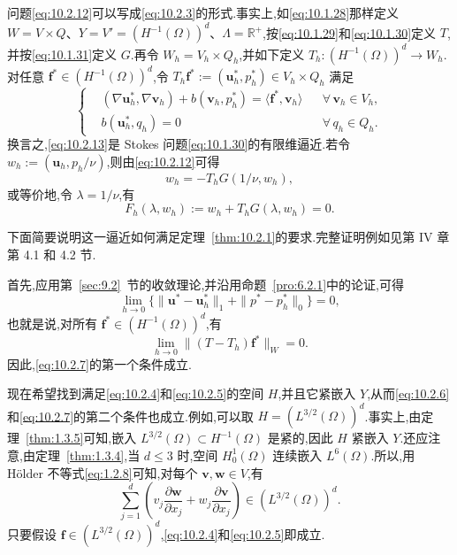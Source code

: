问题\eqref{eq:10.2.12}可以写成\eqref{eq:10.2.3}的形式.事实上,如\eqref{eq:10.1.28}那样定义 \(W=V\times Q\)、\(Y=V'=(H^{-1}(\Omega))^d\)、\(\Lambda=\mathbb R^+\),按\eqref{eq:10.1.29}和\eqref{eq:10.1.30}定义 \(T\),并按\eqref{eq:10.1.31}定义 \(G\).再令 \(W_h=V_h\times Q_h\),并如下定义 \(T_h\colon(H^{-1}(\Omega))^d\to W_h\).对任意 \(\boldsymbol{f}^*\in(H^{-1}(\Omega))^d\),令 \(T_h\boldsymbol{f}^*:=(\boldsymbol{u}_h^*,p_h^*)\in V_h\times Q_h\) 满足
\begin{equation}\label{eq:10.2.13}
  \left\{
  \begin{aligned}
    &(\nabla\boldsymbol{u}_h^*,\nabla\boldsymbol{v}_h)+b(\boldsymbol{v}_h,p_h^*)
       =\langle\boldsymbol{f}^*,\boldsymbol{v}_h\rangle&&\forall\,\boldsymbol{v}_h\in V_h,\\
    &b(\boldsymbol{u}_h^*,q_h)=0&&\forall\,q_h\in Q_h .
  \end{aligned}
  \right.
\end{equation}
换言之,\eqref{eq:10.2.13}是 Stokes 问题\eqref{eq:10.1.30}的有限维逼近.若令 \(w_h:=(\boldsymbol{u}_h,p_h/\nu)\),则由\eqref{eq:10.2.12}可得
\[
  w_h=-T_hG(1/\nu,w_h),
\]
或等价地,令 \(\lambda=1/\nu\),有
\[
  F_h(\lambda,w_h):=w_h+T_hG(\lambda,w_h)=0.
\]

下面简要说明这一逼近如何满足定理~\ref{thm:10.2.1}的要求.完整证明例如见第 IV 章第 4.1 和 4.2 节.

首先,应用第~\ref{sec:9.2}~节的收敛理论,并沿用命题~\ref{pro:6.2.1}中的论证,可得
\[
  \lim_{h\to0}\{\|\boldsymbol{u}^*-\boldsymbol{u}_h^*\|_1+\|p^*-p_h^*\|_0\}=0,
\]
也就是说,对所有 \(\boldsymbol{f}^*\in(H^{-1}(\Omega))^d\),有
\begin{equation}\label{eq:10.2.14}
  \lim_{h\to0}\|(T-T_h)\boldsymbol{f}^*\|_W=0.
\end{equation}
因此,\eqref{eq:10.2.7}的第一个条件成立.

现在希望找到满足\eqref{eq:10.2.4}和\eqref{eq:10.2.5}的空间 \(H\),并且它紧嵌入 \(Y\),从而\eqref{eq:10.2.6}和\eqref{eq:10.2.7}的第二个条件也成立.例如,可以取 \(H=(L^{3/2}(\Omega))^d\).事实上,由定理~\ref{thm:1.3.5}可知,嵌入 \(L^{3/2}(\Omega)\subset H^{-1}(\Omega)\) 是紧的,因此 \(H\) 紧嵌入 \(Y\).还应注意,由定理~\ref{thm:1.3.4},当 \(d\le3\) 时,空间 \(H_0^1(\Omega)\) 连续嵌入 \(L^6(\Omega)\).所以,用 Hölder 不等式\eqref{eq:1.2.8}可知,对每个 \(\boldsymbol{v},\boldsymbol{w}\in V\),有
\[
  \sum_{j=1}^d\left(v_j\frac{\partial\boldsymbol{w}}{\partial x_j}
             +w_j\frac{\partial\boldsymbol{v}}{\partial x_j}\right)
       \in(L^{3/2}(\Omega))^d.
\]
只要假设 \(\boldsymbol{f}\in(L^{3/2}(\Omega))^d\),\eqref{eq:10.2.4}和\eqref{eq:10.2.5}即成立.


